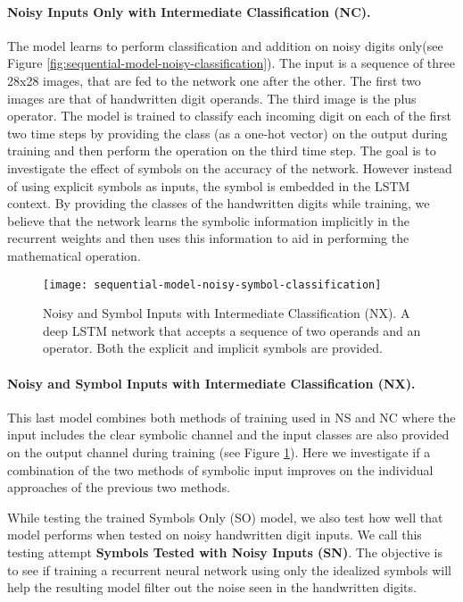 \paragraph{Noisy Inputs Only with Intermediate Classification (NC).} The model learns to perform classification and addition on noisy digits only(see Figure \ref{fig:sequential-model-noisy-classification}). The input is a sequence of three 28x28 images, that are fed to the network one after the other. The first two images are that of handwritten digit operands. The third image is the plus operator. The model is trained to classify each incoming digit on each of the first two time steps by providing the class (as a one-hot vector) on the output during training and then perform the operation on the third time step. The goal is to investigate the effect of symbols on the accuracy of the network. However instead of using explicit symbols as inputs, the symbol is embedded in the LSTM context. By providing the classes of the handwritten digits while training, we believe that the network learns the symbolic information implicitly in the recurrent weights and then uses this information to aid in performing the mathematical operation.

\begin{figure}[t]
	\centering
	\texttt{[image: sequential-model-noisy-symbol-classification]}
	\caption{Noisy and Symbol Inputs with Intermediate Classification (NX). A deep LSTM network that accepts a sequence of two operands and an operator. Both the explicit and implicit symbols are provided.}
	\label{fig:sequential-model-noisy-symbol-classification}
\end{figure}

\paragraph{Noisy and Symbol Inputs with Intermediate Classification (NX).} This last model combines both methods of training used in NS and NC where the input includes the clear symbolic channel and the input classes are also provided on the output channel during training (see Figure \ref{fig:sequential-model-noisy-symbol-classification}). Here we investigate if a combination of the two methods of symbolic input improves on the individual approaches of the previous two methods.

\bigskip

While testing the trained Symbols Only (SO) model, we also test how well that model performs when tested on noisy handwritten digit inputs. We call this testing attempt \textbf{Symbols Tested with Noisy Inputs (SN)}. The objective is to see if training a recurrent neural network using only the idealized symbols will help the resulting model filter out the noise seen in the handwritten digits.

